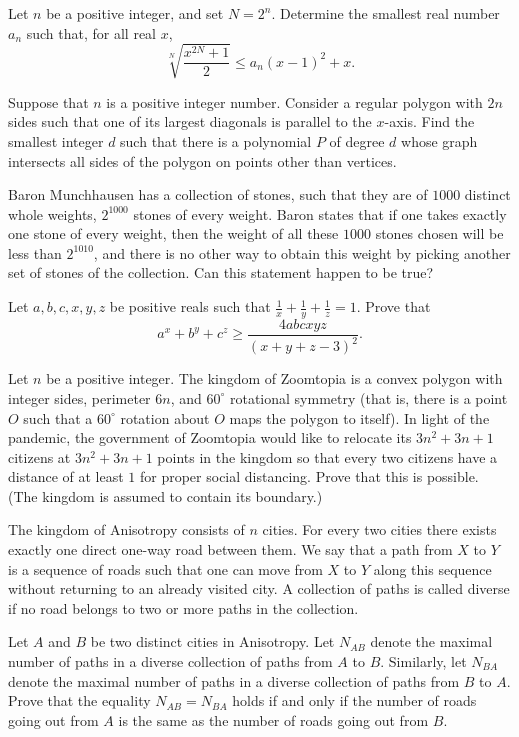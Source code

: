 \documentclass[11pt]{scrartcl}
\begin{document}
\begin{problem}[9026100911884959358]
Let $n$ be a positive integer, and set $N=2^{n}$. Determine the smallest real number $a_{n}$ such that, for all real $x$,
\[
\sqrt[N]{\frac{x^{2 N}+1}{2}} \leqslant a_{n}(x-1)^{2}+x .
\]
\end{problem}
\begin{problem}[9052319155099110464]
	Suppose that $n$ is a positive integer number. Consider a regular polygon with $2n$ sides such that one of its largest diagonals is parallel to the $x$-axis. Find the smallest integer $d$ such that there is a polynomial $P$ of degree $d$ whose graph intersects all sides of the polygon on points other than vertices.
\end{problem}
\begin{problem}[9055967412808709037]
Baron Munchhausen has a collection of stones, such that they are of $1000$ distinct whole weights, $2^{1000}$ stones of every weight. Baron states that if one takes exactly one stone of every weight, then the weight of all these $1000$ stones chosen will be less than $2^{1010}$, and there is no other way to obtain this weight by picking another set of stones of the collection.
Can this statement happen to be true?
\end{problem}
\begin{problem}[9083308405590075982]
	Let $a, b, c,x, y, z$ be positive reals such that $\frac{1}{x}+\frac{1}{y}+\frac{1}{z}=1$. Prove that\[a^x+b^y+c^z\ge \frac{4abcxyz}{(x+y+z-3)^2}.\]
\end{problem}
\begin{problem}[9085006630991620229]
Let \(n\) be a positive integer. The kingdom of Zoomtopia is a convex polygon with integer sides, perimeter \(6n\), and \(60^\circ\) rotational symmetry (that is, there is a point \(O\) such that a \(60^\circ\) rotation about \(O\) maps the polygon to itself). In light of the pandemic, the government of Zoomtopia would like to relocate its \(3n^2+3n+1\) citizens at \(3n^2+3n+1\) points in the kingdom so that every two citizens have a distance of at least \(1\) for proper social distancing. Prove that this is possible. (The kingdom is assumed to contain its boundary.)
\end{problem}
\begin{problem}[9103148252094553273]
	The kingdom of Anisotropy consists of $n$ cities. For every two cities there exists exactly one direct one-way road between them. We say that a path from $X$ to $Y$ is a sequence of roads such that one can move from $X$ to $Y$ along this sequence without returning to an already visited city. A collection of paths is called diverse if no road belongs to two or more paths in the collection.

Let $A$ and $B$ be two distinct cities in Anisotropy. Let $N_{AB}$ denote the maximal number of paths in a diverse collection of paths from $A$ to $B$. Similarly, let $N_{BA}$ denote the maximal number of paths in a diverse collection of paths from $B$ to $A$. Prove that the equality $N_{AB} = N_{BA}$ holds if and only if the number of roads going out from $A$ is the same as the number of roads going out from $B$.
\end{problem}
\end{document}
